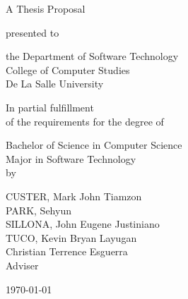%
%
%                 

\begin{titlepage}
\centering



\vspace{1.5cm}

A Thesis Proposal\\

\vspace{0.5cm}

presented to\\

\vspace{0.5cm}

the Department of Software Technology\\
College of Computer Studies\\
De La Salle University

\vspace{1cm}

In partial fulfillment\\
of the requirements for the degree of\\

\vspace{0.5cm}

Bachelor of Science in Computer Science\\
Major in Software Technology
\vspace{1.75cm}
\\by\\


\vspace{1cm}

CUSTER, Mark John Tiamzon  \\
PARK, Sehyun \\
SILLONA, John Eugene Justiniano  \\
TUCO, Kevin Bryan Layugan  \\

\vspace{1.75cm}
Christian Terrence Esguerra \\
Adviser

\vspace{1.25cm}
\today
\end{titlepage}
